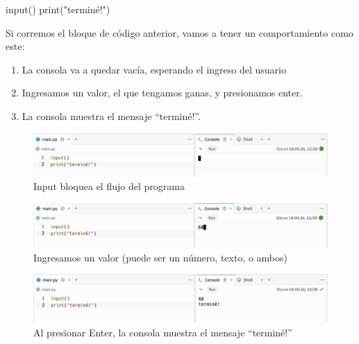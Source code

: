 \documentclass[
  letterpaper,
  DIV=11,
  numbers=noendperiod]{scrreprt}
\newenvironment{Shaded}{\begin{snugshade}}{\end{snugshade}}
\newcommand{\BuiltInTok}[1]{\textcolor[rgb]{0.00,0.23,0.31}{#1}}
\newcommand{\NormalTok}[1]{\textcolor[rgb]{0.00,0.23,0.31}{#1}}
\newcommand{\StringTok}[1]{\textcolor[rgb]{0.13,0.47,0.30}{#1}}
\providecommand{\tightlist}{%
  \setlength{\itemsep}{0pt}\setlength{\parskip}{0pt}}\usepackage{longtable,booktabs,array}
\begin{document}
\begin{Shaded}
\begin{Highlighting}[]
\BuiltInTok{input}\NormalTok{()}
\BuiltInTok{print}\NormalTok{(}\StringTok{"terminé!"}\NormalTok{)}
\end{Highlighting}
\end{Shaded}

Si corremos el bloque de código anterior, vamos a tener un
comportamiento como este:

\begin{enumerate}
\def\labelenumi{\arabic{enumi}.}
\tightlist
\item
  La consola va a quedar vacía, esperando el ingreso del usuario
\item
  Ingresamos un valor, el que tengamos ganas, y presionamos enter.
\item
  La consola muestra el mensaje ``terminé!''.
\end{enumerate}

\begin{figure}

{\centering \includegraphics{./imgs/unidad_2/input1.png}

}

\caption{Input bloquea el flujo del programa}

\end{figure}

\begin{figure}

{\centering \includegraphics{./imgs/unidad_2/input2.png}

}

\caption{Ingresamos un valor (puede ser un número, texto, o ambos)}

\end{figure}

\begin{figure}

{\centering \includegraphics{./imgs/unidad_2/input3.png}

}

\caption{Al presionar Enter, la consola muestra el mensaje ``terminé!''}

\end{figure}
\end{document}
